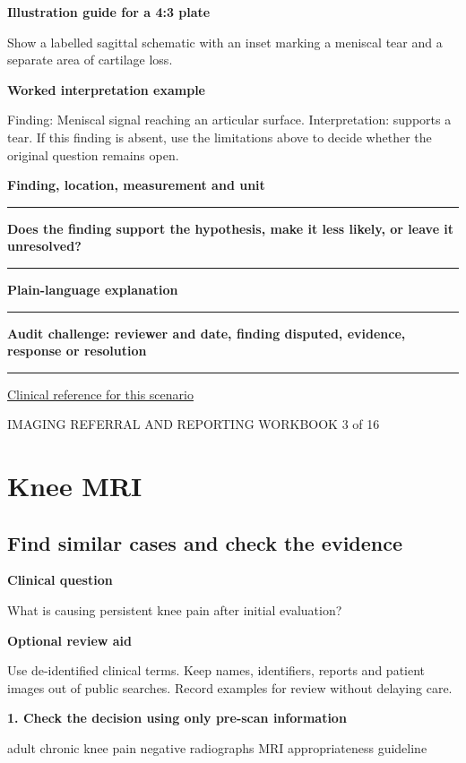 \documentclass[11pt,a4paper]{article}
\newcommand{\record}[1]{\textbf{#1}\par\vspace{0.55\baselineskip}\hrule\vspace{0.35\baselineskip}}
\begin{document}
\textbf{Illustration guide for a 4:3 plate}\par Show a labelled sagittal schematic with an inset marking a meniscal tear and a separate area of cartilage loss.\par

\textbf{Worked interpretation example}\par Finding: Meniscal signal reaching an articular surface. Interpretation: supports a tear. If this finding is absent, use the limitations above to decide whether the original question remains open.\par

\record{Finding, location, measurement and unit}

\record{Does the finding support the hypothesis, make it less likely, or leave it unresolved?}

\record{Plain-language explanation}

\record{Audit challenge: reviewer and date, finding disputed, evidence, response or resolution}

\small\href{https://acsearch.acr.org/docs/69432/Narrative}{Clinical reference for this scenario}

\normalsize

\newpage

{\small IMAGING REFERRAL AND REPORTING WORKBOOK \hfill 3 of 16}

\section*{Knee MRI}

\subsection*{Find similar cases and check the evidence}

\textbf{Clinical question}\par What is causing persistent knee pain after initial evaluation?\par

\textbf{Optional review aid}\par Use de-identified clinical terms. Keep names, identifiers, reports and patient images out of public searches. Record examples for review without delaying care.\par

\textbf{1. Check the decision using only pre-scan information}\par adult chronic knee pain negative radiographs MRI appropriateness guideline\par
\end{document}
